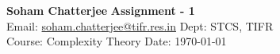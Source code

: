\documentclass[a4paper, 11pt]{article}
\begin{document}
	
	
	\textsf{\noindent \large\textbf{Soham Chatterjee} \hfill \textbf{Assignment - 1}\\
		Email: \href{soham.chatterjee@tifr.res.in}{soham.chatterjee@tifr.res.in} \hfill Dept: STCS, TIFR\\
		\normalsize Course: Complexity Theory \hfill Date: \today}
	
	
\end{document}
